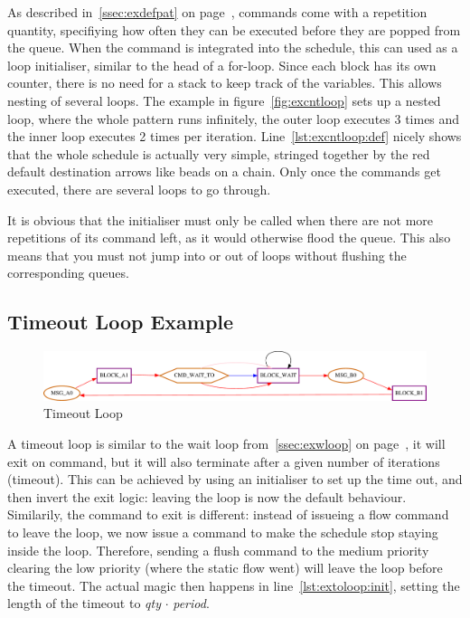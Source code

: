 As described in~\ref{ssec:exdefpat} on page~\pageref{ssec:exdefpat}, commands come with a repetition quantity, specifiying how often they can be executed before they are popped from the queue.
When the command is integrated into the schedule, this can used as a loop initialiser, similar to the head of a for-loop. Since each block has its own
counter, there is no need for a stack to keep track of the variables. This allows nesting of several loops. The example in figure~\ref{fig:excntloop} sets up a nested loop, where the whole pattern runs infinitely, the outer loop executes 3 times and the inner loop executes 2 times per iteration. Line~\ref{lst:excntloop:def} nicely shows that the whole schedule is actually very simple, stringed together by the red default destination arrows like beads on a chain.
Only once the commands get executed, there are several loops to go through.
\par It is obvious that the initialiser must only be called when there are not more repetitions of its command left, as it would otherwise flood the queue.
This also means that you must not jump into or out of loops without flushing the corresponding queues.
\vspace{2ex}

\subsection{Timeout Loop Example}
%
\begin{figure}[H]
   \centering
   \def\svgwidth{1.0\textwidth}
   \includegraphics*[width=1.0\textwidth,keepaspectratio]{Figures/extoloop}
   \caption{ Timeout Loop }
   \label{fig:extoloop}
\end{figure}



A timeout loop is similar to the wait loop from~\ref{ssec:exwloop} on page~\pageref{ssec:exwloop}, it will exit on command, but it will also terminate after a given number of iterations (timeout).
This can be achieved by using an initialiser to set up the time out, and then invert the exit logic: leaving the loop is now the default behaviour. Similarily, the command to exit is different: instead of issueing a flow command to leave the loop, we now issue a command to make the schedule stop staying inside the loop. Therefore, sending a flush command to the medium priority clearing the low priority (where the static flow went) will leave the loop before the timeout. The actual magic then happens in line~\ref{lst:extoloop:init}, setting the length of the timeout to \emph{qty} $\cdot$ \emph{period}.
\vspace{2ex}


